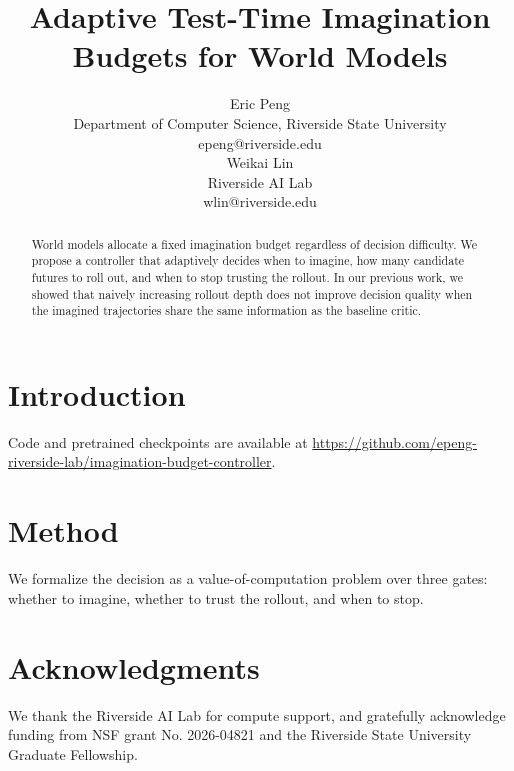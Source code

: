 \documentclass{article}
\title{Adaptive Test-Time Imagination Budgets for World Models}
\author{
Eric Peng \\
Department of Computer Science, Riverside State University \\
epeng@riverside.edu \\
\And
Weikai Lin \\
Riverside AI Lab \\
wlin@riverside.edu
}
\begin{document}
\maketitle

\begin{abstract}
World models allocate a fixed imagination budget regardless of decision difficulty.
We propose a controller that adaptively decides when to imagine, how many candidate
futures to roll out, and when to stop trusting the rollout. In our previous work,
we showed that naively increasing rollout depth does not improve decision quality
when the imagined trajectories share the same information as the baseline critic.
\end{abstract}

\section{Introduction}
Code and pretrained checkpoints are available at
\url{https://github.com/epeng-riverside-lab/imagination-budget-controller}.

\section{Method}
We formalize the decision as a value-of-computation problem over three gates:
whether to imagine, whether to trust the rollout, and when to stop.

\section*{Acknowledgments}
We thank the Riverside AI Lab for compute support, and gratefully acknowledge
funding from NSF grant No. 2026-04821 and the Riverside State University
Graduate Fellowship.
\end{document}
